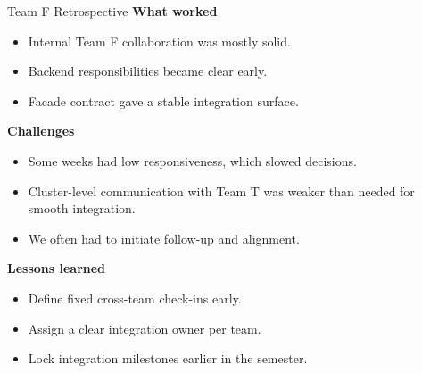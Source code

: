 \documentclass[aspectratio=169]{beamer}
\begin{document}
\begin{frame}{Team F Retrospective}
  \textbf{What worked}
  \begin{itemize}
    \item Internal Team F collaboration was mostly solid.
    \item Backend responsibilities became clear early.
    \item Facade contract gave a stable integration surface.
  \end{itemize}

  \vspace{0.5em}
  \textbf{Challenges}
  \begin{itemize}
    \item Some weeks had low responsiveness, which slowed decisions.
    \item Cluster-level communication with Team T was weaker than needed for smooth integration.
    \item We often had to initiate follow-up and alignment.
  \end{itemize}

  \vspace{0.5em}
  \textbf{Lessons learned}
  \begin{itemize}
    \item Define fixed cross-team check-ins early.
    \item Assign a clear integration owner per team.
    \item Lock integration milestones earlier in the semester.
  \end{itemize}
\end{frame}
\end{document}
